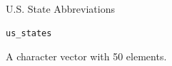 %
\begin{Description}
U.S. State Abbreviations
\end{Description}
%
\begin{Usage}
\begin{verbatim}
us_states
\end{verbatim}
\end{Usage}
%
\begin{Format}
%
\begin{SubSection}{}

A character vector with 50 elements.
\end{SubSection}

\end{Format}
